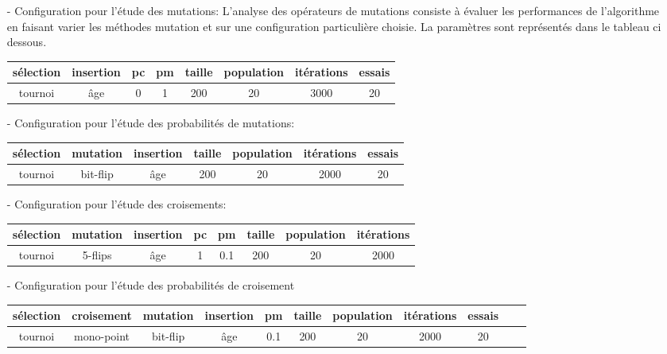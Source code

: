 \documentclass{article}
\begin{document}
\begin{itemize}
    \item[-] Configuration pour l'étude des mutations: L'analyse des opérateurs de mutations consiste à évaluer les performances de l'algorithme en faisant varier les méthodes mutation et sur une configuration particulière choisie. La paramètres sont représentés dans le tableau ci dessous.
    
    \begin{tabular}{|c|c|c|c|c|c|c|c|}
    \hline
    sélection & insertion & pc & pm & taille & population & itérations & essais \\
    \hline
    tournoi & âge & 0 & 1 & 200 & 20 & 3000 & 20\\
    \hline
    \end{tabular}
    
    \item[-] Configuration pour l'étude des probabilités de mutations:
    
    \begin{tabular}{|c|c|c|c|c|c|c|}
    \hline
    sélection & mutation & insertion & taille & population & itérations & essais \\
    \hline
    tournoi & bit-flip & âge & 200 & 20 & 2000 & 20\\
    \hline
    \end{tabular}
    
    
    \item[-] Configuration pour l'étude des croisements:
    
    \begin{tabular}{|c|c|c|c|c|c|c|c|}
     \hline
    sélection & mutation & insertion & pc & pm & taille & population & itérations \\
    \hline
    tournoi & 5-flips & âge & 1 & 0.1 & 200 & 20 & 2000\\
    \hline
    \end{tabular}
    
    \item[-] Configuration pour l'étude des probabilités de croisement
        
     \begin{tabular}{|c|c|c|c|c|c|c|c|c|c|c|}
     \hline
    sélection & croisement &  mutation & insertion & pm & taille & population & itérations & essais \\
    \hline
    tournoi & mono-point & bit-flip & âge & 0.1 & 200 & 20 & 2000 & 20\\
    \hline
    \end{tabular}
    

\end{itemize}
\end{document}
